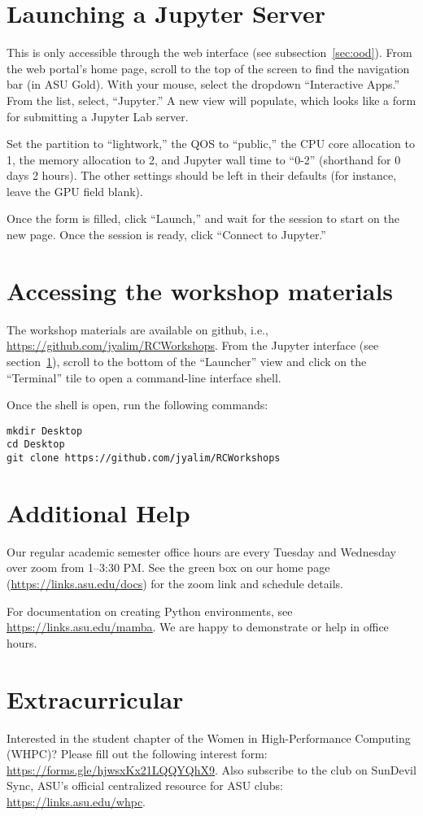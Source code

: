 \documentclass[11pt]{article}
\newcommand{\myurl}[1]{\href{#1}{\color{blue}\setulcolor{blue}\ul{\mbox{#1}}}}
\def\ghub{https://github.com/jyalim/RCWorkshops}
\def\docshomepage{https://links.asu.edu/docs}
\def\mamba{https://links.asu.edu/mamba}
\def\whpcclub{https://links.asu.edu/whpc}
\def\whpcform{https://forms.gle/hjwsxKx21LQQYQhX9}
\begin{document}
\section{Launching a Jupyter Server}\label{sec:jupyter}

This is only accessible through the web interface (see
subsection~\ref{sec:ood}). From the web portal's home page, scroll to
the top of the screen to find the navigation bar (in ASU Gold). With
your mouse, select the dropdown ``Interactive Apps.'' From the list,
select, ``Jupyter.'' A new view will populate, which looks like a form
for submitting a Jupyter Lab server.

Set the partition to ``lightwork,'' 
    the QOS to ``public,''
    the CPU core allocation to 1,
    the memory allocation to 2,
    and Jupyter wall time to ``0-2'' (shorthand for 0 days 2 hours).
The other settings should be left in their defaults (for instance, leave
the GPU field blank).

Once the form is filled, click ``Launch,'' and wait for the session to
start on the new page. Once the session is ready, click ``Connect to
Jupyter.''

\section{Accessing the workshop materials}

The workshop materials are available on github, i.e., 
\myurl{\ghub}.
From the Jupyter interface (see section~\ref{sec:jupyter}), scroll to
the bottom of the ``Launcher'' view and click on the ``Terminal'' tile
to open a command-line interface shell.

Once the shell is open, run the following commands:
\begin{lstlisting}
mkdir Desktop
cd Desktop
git clone https://github.com/jyalim/RCWorkshops
\end{lstlisting}

\section{Additional Help}

Our regular academic semester office hours are every Tuesday and
Wednesday over zoom from 1--3:30 PM. See the green box on our home
page (\myurl{\docshomepage}) for the zoom link and
schedule details.

For documentation on creating Python environments, see 
\myurl{\mamba}. We are happy to demonstrate or help in office
hours.

\section{Extracurricular}

Interested in the student chapter of the Women in High-Performance
Computing (WHPC)? 
Please fill out the following interest form:
\myurl{\whpcform}.
Also subscribe to the club on SunDevil Sync, ASU's official centralized
resource for ASU clubs: 
\myurl{\whpcclub}.
\end{document}
